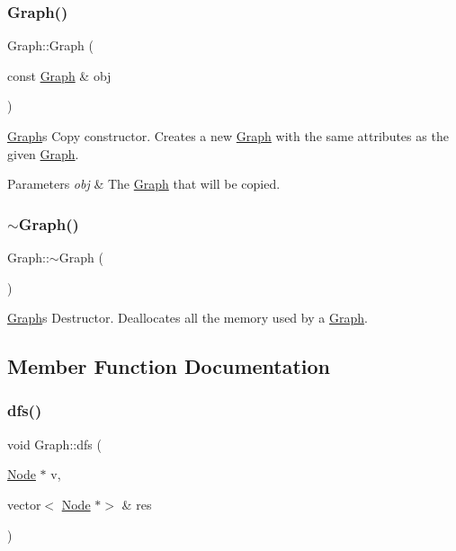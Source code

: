 \subsubsection{\texorpdfstring{Graph()}{Graph()}\hspace{0.1cm}{\footnotesize\ttfamily [2/2]}}
{\footnotesize\ttfamily Graph\+::\+Graph (\begin{DoxyParamCaption}\item[{const \hyperlink{class_graph}{Graph} \&}]{obj }\end{DoxyParamCaption})}

\hyperlink{class_graph}{Graph}\textquotesingle{}s Copy constructor. Creates a new \hyperlink{class_graph}{Graph} with the same attributes as the given \hyperlink{class_graph}{Graph}.


\begin{DoxyParams}{Parameters}
{\em obj} & The \hyperlink{class_graph}{Graph} that will be copied. \\
\hline
\end{DoxyParams}
\hypertarget{class_graph_a902c5b3eacb66d60752525ab23297a95}{}\label{class_graph_a902c5b3eacb66d60752525ab23297a95} 
\subsubsection{\texorpdfstring{$\sim$\+Graph()}{~Graph()}}
{\footnotesize\ttfamily Graph\+::$\sim$\+Graph (\begin{DoxyParamCaption}{ }\end{DoxyParamCaption})}

\hyperlink{class_graph}{Graph}\textquotesingle{}s Destructor. Deallocates all the memory used by a \hyperlink{class_graph}{Graph}. 

\subsection{Member Function Documentation}
\hypertarget{class_graph_ab596c4b805ecdf622c4f3d952f894a50}{}\label{class_graph_ab596c4b805ecdf622c4f3d952f894a50} 
\subsubsection{\texorpdfstring{dfs()}{dfs()}}
{\footnotesize\ttfamily void Graph\+::dfs (\begin{DoxyParamCaption}\item[{\hyperlink{class_node}{Node} $\ast$}]{v,  }\item[{vector$<$ \hyperlink{class_node}{Node} $\ast$$>$ \&}]{res }\end{DoxyParamCaption})}

